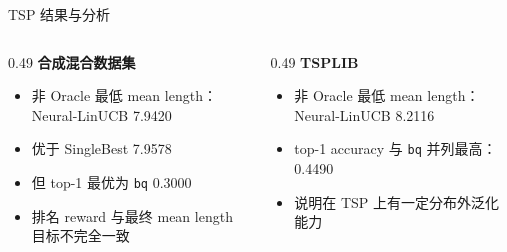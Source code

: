 \documentclass{ctexbeamer}
\begin{document}
\begin{frame}{TSP 结果与分析}
  \vspace{0.8em}
  \begin{columns}[T,totalwidth=\textwidth]
    \begin{column}{0.49\textwidth}
      \textbf{合成混合数据集}
      \begin{itemize}
        \item 非 Oracle 最低 mean length：Neural-LinUCB 7.9420
        \item 优于 SingleBest 7.9578
        \item 但 top-1 最优为 \texttt{bq} 0.3000
        \item 排名 reward 与最终 mean length 目标不完全一致
      \end{itemize}
    \end{column}
    \begin{column}{0.49\textwidth}
      \textbf{TSPLIB}
      \begin{itemize}
        \item 非 Oracle 最低 mean length：Neural-LinUCB 8.2116
        \item top-1 accuracy 与 \texttt{bq} 并列最高：0.4490
        \item 说明在 TSP 上有一定分布外泛化能力
      \end{itemize}
    \end{column}
  \end{columns}
\end{frame}
\end{document}
